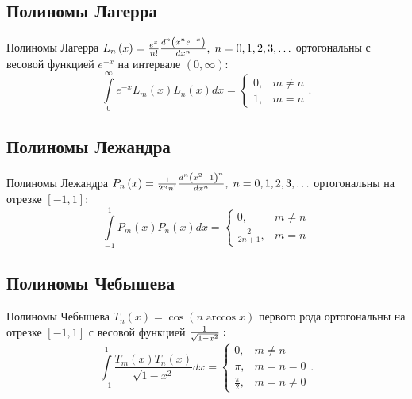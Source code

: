 \subsection{Полиномы Лагерра}
Полиномы Лагерра 
${L_n}\left( x \right) = {\large\frac{{{e^x}}}{{n!}}\normalsize} {\large\frac{{{d^n}\left( {{x^n}{e^{ - x}}} \right)}}{{d{x^n}}}\normalsize},\;n = 0,1,2,3, \ldots $ 
ортогональны с весовой функцией ${{e^{ - x}}}$ на интервале $\left( {0,\infty } \right):$ 
$$ \int\limits_0^\infty {{e^{ - x}}{L_m}\left( x \right){L_n}\left( x \right)dx} = \begin{cases} 0, & m \ne n \\ 1, & m = n \end{cases}. $$
\subsection{Полиномы Лежандра}
Полиномы Лежандра ${P_n}\left( x \right) = {\large\frac{1}{{{2^n}n!}}\normalsize} {\large\frac{{{d^n}{{\left( {{x^2} - 1} \right)}^n}}}{{d{x^n}}}\normalsize},\;n = 0,1,2,3, \ldots $ 
ортогональны на отрезке $\left[ {-1,1} \right]:$ 
$$ \int\limits_{ - 1}^1 {{P_m}\left( x \right){P_n}\left( x \right)dx} = \begin{cases} 0, & m \ne n \\ \frac{2}{{2n + 1}}, & m = n \end{cases}$$
\subsection{Полиномы Чебышева}
Полиномы Чебышева ${T_n}\left( x \right) = \cos \left( {n\arccos x} \right)$ первого рода ортогональны на отрезке $\left[ {-1,1} \right]$ с весовой функцией $\large\frac{1}{{\sqrt {1 - {x^2}} }}\normalsize :$ 
$$ \int\limits_{ - 1}^1 {\frac{{{T_m}\left( x \right){T_n}\left( x \right)}}{{\sqrt {1 - {x^2}} }}dx} = \begin{cases} 0, & m \ne n \\ \pi, & m = n = 0 \\ \frac{\pi }{2}, & m = n \ne 0 \end{cases}. $$

